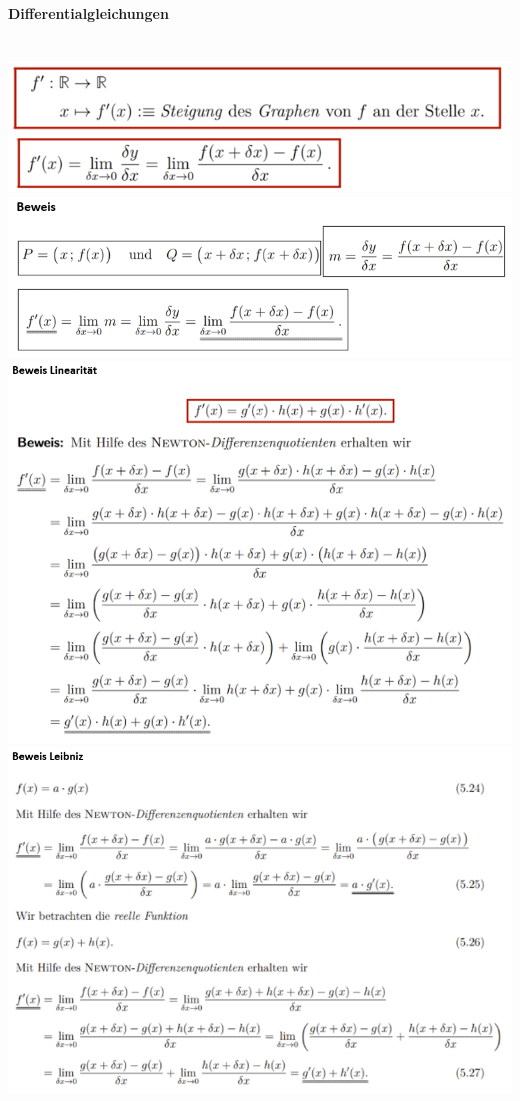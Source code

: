 \paragraph{Differentialgleichungen}\mbox{}\\
\noindent
\includegraphics[width=\columnwidth]{./images/diff.png}
\includegraphics[width=\columnwidth]{./images/diff1.png}
\includegraphics[width=\columnwidth]{./images/diff2.png}
\includegraphics[width=\columnwidth]{./images/diff3.png}
